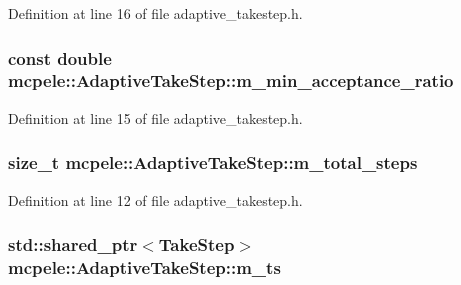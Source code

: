 \-Definition at line 16 of file adaptive\-\_\-takestep.\-h.

\hypertarget{classmcpele_1_1AdaptiveTakeStep_ad6c2c748b3effbbb8ab2cec826419e88}{
\subsubsection[{m\-\_\-min\-\_\-acceptance\-\_\-ratio}]{\setlength{\rightskip}{0pt plus 5cm}const double {\bf mcpele\-::\-Adaptive\-Take\-Step\-::m\-\_\-min\-\_\-acceptance\-\_\-ratio}}}\label{classmcpele_1_1AdaptiveTakeStep_ad6c2c748b3effbbb8ab2cec826419e88}


\-Definition at line 15 of file adaptive\-\_\-takestep.\-h.

\hypertarget{classmcpele_1_1AdaptiveTakeStep_a40288a04fe0de43963d7e6284b1a44e3}{
\subsubsection[{m\-\_\-total\-\_\-steps}]{\setlength{\rightskip}{0pt plus 5cm}size\-\_\-t {\bf mcpele\-::\-Adaptive\-Take\-Step\-::m\-\_\-total\-\_\-steps}}}\label{classmcpele_1_1AdaptiveTakeStep_a40288a04fe0de43963d7e6284b1a44e3}


\-Definition at line 12 of file adaptive\-\_\-takestep.\-h.

\hypertarget{classmcpele_1_1AdaptiveTakeStep_a2f43525fa8608daabab615459b3ae42a}{
\subsubsection[{m\-\_\-ts}]{\setlength{\rightskip}{0pt plus 5cm}std\-::shared\-\_\-ptr$<${\bf \-Take\-Step}$>$ {\bf mcpele\-::\-Adaptive\-Take\-Step\-::m\-\_\-ts}}}\label{classmcpele_1_1AdaptiveTakeStep_a2f43525fa8608daabab615459b3ae42a}



